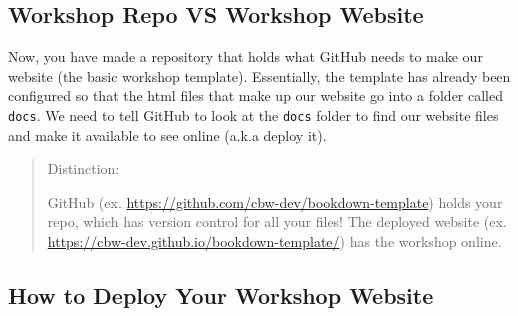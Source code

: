 \documentclass[
]{book}
\theoremstyle{definition}
\theoremstyle{definition}
\theoremstyle{definition}
\theoremstyle{definition}
\theoremstyle{remark}
\begin{document}
\subsection{Workshop Repo VS Workshop Website}\label{workshop-repo-vs-workshop-website}

Now, you have made a repository that holds what GitHub needs to make our website (the basic workshop template). Essentially, the template has already been configured so that the html files that make up our website go into a folder called \texttt{docs}. We need to tell GitHub to look at the \texttt{docs} folder to find our website files and make it available to see online (a.k.a deploy it).

\begin{quote}
Distinction:

GitHub (ex. \url{https://github.com/cbw-dev/bookdown-template}) holds your repo, which has version control for all your files! The deployed website (ex. \url{https://cbw-dev.github.io/bookdown-template/}) has the workshop online.
\end{quote}

\subsection{How to Deploy Your Workshop Website}\label{how-to-deploy-your-workshop-website}
\end{document}
